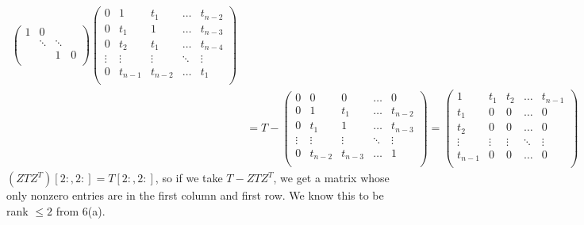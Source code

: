 \documentclass[11pt]{article}
\begin{document}
\begin{enumerate}
\begin{enumerate}[label=(\alph*)]
\begin{align*}
\begin{pmatrix}
				            1 & 0      &        &   \\
				              & \ddots & \ddots &   \\
				              &        & 1      & 0 \\
			            \end{pmatrix}
			            \begin{pmatrix}
				            0      & 1       & t_1     & \hdots & t_{n-2} \\
				            0      & t_1     & 1       & \hdots & t_{n-3} \\
				            0      & t_2     & t_1     & \hdots & t_{n-4} \\
				            \vdots & \vdots  & \vdots  & \ddots & \vdots  \\
				            0      & t_{n-1} & t_{n-2} & \hdots & t_1     \\
			            \end{pmatrix} \\
			              & = T -
			            \begin{pmatrix}
				            0      & 0       & 0       & \hdots & 0       \\
				            0      & 1       & t_1     & \hdots & t_{n-2} \\
				            0      & t_1     & 1       & \hdots & t_{n-3} \\
				            \vdots & \vdots  & \vdots  & \ddots & \vdots  \\
				            0      & t_{n-2} & t_{n-3} & \hdots & 1       \\
			            \end{pmatrix}
			            =
			            \begin{pmatrix}
				            1       & t_1    & t_2    & \hdots & t_{n-1} \\
				            t_1     & 0      & 0      & \hdots & 0       \\
				            t_2     & 0      & 0      & \hdots & 0       \\
				            \vdots  & \vdots & \vdots & \ddots & \vdots  \\
				            t_{n-1} & 0      & 0      & \hdots & 0       \\
			            \end{pmatrix}
		            \end{align*}
		            \((ZTZ^T)[2:, 2:] = T[2:,2:]\), so if we take \(T - ZTZ^T\), we get a matrix whose only nonzero entries are in the first column and first row.  We know this to be rank \(\leq 2\) from 6(a).


\end{enumerate}
\end{enumerate}
\end{document}
